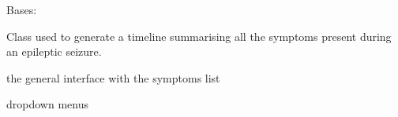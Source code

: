 \documentclass[letterpaper,10pt,english]{sphinxmanual}
\begin{document}
\begin{fulllineitems}
\label{\detokenize{general_interface:general_interface_V10.FriseSymptomes}}
\pysigstartsignatures
{}
\pysigstopsignatures
\sphinxAtStartPar
Bases: 

\sphinxAtStartPar
Class used to generate a timeline summarising all the symptoms present during an epileptic seizure.

\begin{fulllineitems}
\label{\detokenize{general_interface:general_interface_V10.FriseSymptomes.interfaceGenerale}}
\pysigstartsignatures
{}
\pysigstopsignatures
\sphinxAtStartPar
the general interface with the symptoms list
\begin{quote}\begin{description}
\sphinxAtStartPar
{\hyperref[\detokenize{general_interface:general_interface_V10.InterfaceGenerale}]{}}

\end{description}\end{quote}

\end{fulllineitems}


\begin{fulllineitems}
\label{\detokenize{general_interface:general_interface_V10.FriseSymptomes.MenuDeroulant}}
\pysigstartsignatures
{}
\pysigstopsignatures
\sphinxAtStartPar
dropdown menus
\begin{quote}\begin{description}
\sphinxAtStartPar
{\hyperref[\detokenize{general_interface:general_interface_V10.Menu_symptomes}]{}}


\end{description}
\end{quote}
\end{fulllineitems}
\end{fulllineitems}
\end{document}
